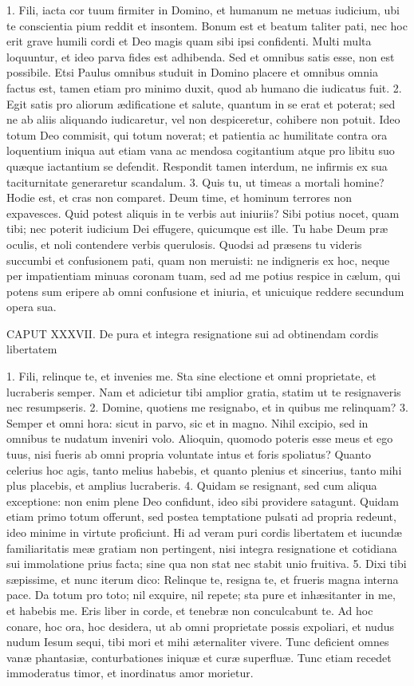 1. Fili, iacta cor tuum firmiter in Domino, et humanum ne metuas iudicium, ubi te conscientia pium reddit et insontem. Bonum est et beatum taliter pati, nec hoc erit grave humili cordi et Deo magis quam sibi ipsi confidenti. Multi multa loquuntur, et ideo parva fides est adhibenda. Sed et omnibus satis esse, non est possibile. Etsi Paulus omnibus studuit in Domino placere et omnibus omnia factus est, tamen etiam pro minimo duxit, quod ab humano die iudicatus fuit.
2. Egit satis pro aliorum ædificatione et salute, quantum in se erat et poterat; sed ne ab aliis aliquando iudicaretur, vel non despiceretur, cohibere non potuit. Ideo totum Deo commisit, qui totum noverat; et patientia ac humilitate contra ora loquentium iniqua aut etiam vana ac mendosa cogitantium atque pro libitu suo quæque iactantium se defendit. Respondit tamen interdum, ne infirmis ex sua taciturnitate generaretur scandalum.
3. Quis tu, ut timeas a mortali homine? Hodie est, et cras non comparet. Deum time, et hominum terrores non expavesces. Quid potest aliquis in te verbis aut iniuriis? Sibi potius nocet, quam tibi; nec poterit iudicium Dei effugere, quicumque est ille. Tu habe Deum præ oculis, et noli contendere verbis querulosis. Quodsi ad præsens tu videris succumbi et confusionem pati, quam non meruisti: ne indigneris ex hoc, neque per impatientiam minuas coronam tuam, sed ad me potius respice in cælum, qui potens sum eripere ab omni confusione et iniuria, et unicuique reddere secundum opera sua.


CAPUT XXXVII.
De pura et integra resignatione sui ad obtinendam cordis libertatem

1. Fili, relinque te, et invenies me. Sta sine electione et omni proprietate, et lucraberis semper. Nam et adicietur tibi amplior gratia, statim ut te resignaveris nec resumpseris.
2. Domine, quotiens me resignabo, et in quibus me relinquam?
3. Semper et omni hora: sicut in parvo, sic et in magno. Nihil excipio, sed in omnibus te nudatum inveniri volo. Alioquin, quomodo poteris esse meus et ego tuus, nisi fueris ab omni propria voluntate intus et foris spoliatus? Quanto celerius hoc agis, tanto melius habebis, et quanto plenius et sincerius, tanto mihi plus placebis, et amplius lucraberis.
4. Quidam se resignant, sed cum aliqua exceptione: non enim plene Deo confidunt, ideo sibi providere satagunt. Quidam etiam primo totum offerunt, sed postea temptatione pulsati ad propria redeunt, ideo minime in virtute proficiunt. Hi ad veram puri cordis libertatem et iucundæ familiaritatis meæ gratiam non pertingent, nisi integra resignatione et cotidiana sui immolatione prius facta; sine qua non stat nec stabit unio fruitiva.
5. Dixi tibi sæpissime, et nunc iterum dico: Relinque te, resigna te, et frueris magna interna pace. Da totum pro toto; nil exquire, nil repete; sta pure et inhæsitanter in me, et habebis me. Eris liber in corde, et tenebræ non conculcabunt te. Ad hoc conare, hoc ora, hoc desidera, ut ab omni proprietate possis expoliari, et nudus nudum Iesum sequi, tibi mori et mihi æternaliter vivere. Tunc deficient omnes vanæ phantasiæ, conturbationes iniquæ et curæ superfluæ. Tunc etiam recedet immoderatus timor, et inordinatus amor morietur.


